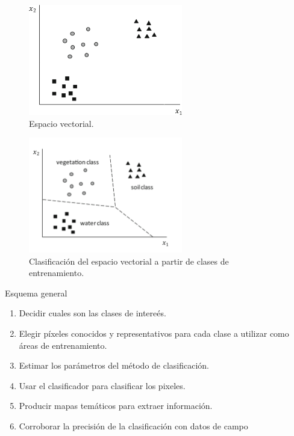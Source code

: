 \documentclass[]{beamer}
\begin{document}
\begin{frame}{\subsecname}
  \begin{figure}
  \includegraphics[width=0.6\textwidth]{imagenes/vector-3.png}
  \caption{Espacio vectorial.}
  \end{figure}
\end{frame}

\begin{frame}{\subsecname}
  \begin{figure}
  \includegraphics[width=0.6\textwidth]{imagenes/vector-2.png}
  \caption{Clasificación del espacio vectorial a partir de clases de entrenamiento.}
  \end{figure}
\end{frame}

\begin{frame}{\subsecname}
  \begin{block}{Esquema general}
    \begin{enumerate}[<+>]
      \item Decidir cuales son las clases de intereés.
      \item Elegir píxeles conocidos y representativos para cada clase a utilizar como áreas de entrenamiento.
      \item Estimar los parámetros del método de clasificación.
      \item Usar el clasificador para clasificar los pixeles.
      \item Producir mapas temáticos para extraer información.
      \item Corroborar la precisión de la clasificación con datos de campo
    \end{enumerate}
  \end{block}
\end{frame}
\end{document}
